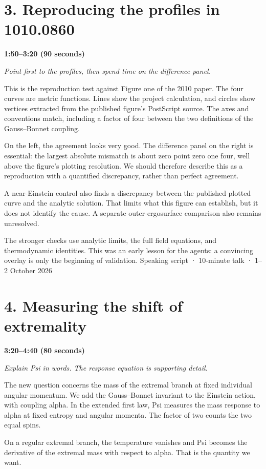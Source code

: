 \documentclass[12pt,a4paper]{article}
\begin{document}
\section*{3. Reproducing the profiles in 1010.0860}
\textbf{1:50--3:20 (90 seconds)}\par
{\itshape Point first to the profiles, then spend time on the difference panel.}\par\medskip
This is the reproduction test against Figure one of the 2010 paper. The four curves are metric functions. Lines show the project calculation, and circles show vertices extracted from the published figure's PostScript source. The axes and conventions match, including a factor of four between the two definitions of the Gauss--Bonnet coupling.

On the left, the agreement looks very good. The difference panel on the right is essential: the largest absolute mismatch is about zero point zero one four, well above the figure's plotting resolution. We should therefore describe this as a reproduction with a quantified discrepancy, rather than perfect agreement.

A near-Einstein control also finds a discrepancy between the published plotted curve and the analytic solution. That limits what this figure can establish, but it does not identify the cause. A separate outer-ergosurface comparison also remains unresolved.

The stronger checks use analytic limits, the full field equations, and thermodynamic identities. This was an early lesson for the agents: a convincing overlay is only the beginning of validation.
\newpage
{\small Speaking script · 10-minute talk · 1--2 October 2026}\par
\section*{4. Measuring the shift of extremality}
\textbf{3:20--4:40 (80 seconds)}\par
{\itshape Explain Psi in words. The response equation is supporting detail.}\par\medskip
The new question concerns the mass of the extremal branch at fixed individual angular momentum. We add the Gauss--Bonnet invariant to the Einstein action, with coupling alpha. In the extended first law, Psi measures the mass response to alpha at fixed entropy and angular momenta. The factor of two counts the two equal spins.

On a regular extremal branch, the temperature vanishes and Psi becomes the derivative of the extremal mass with respect to alpha. That is the quantity we want.
\end{document}
